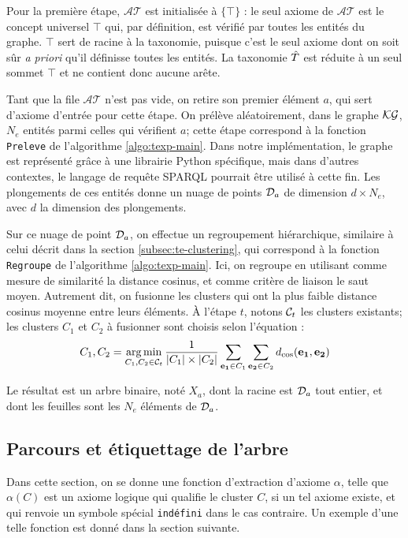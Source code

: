 Pour la première étape, $\mathcal{AT}$ est initialisée à $\{\top\}$ : le seul axiome de $\mathcal{AT}$ est le concept universel $\top$ qui, par définition, est vérifié par toutes les entités du graphe. $\top$ sert de racine à la taxonomie, puisque c'est le seul axiome dont on soit sûr \textit{a priori} qu'il définisse toutes les entités.
La taxonomie $\Tpred$ est réduite à un seul sommet $\top$ et ne contient donc aucune arête. 

Tant que la file $\mathcal{AT}$ n'est pas vide, on retire son premier élément $a$, qui sert d'axiome d'entrée pour cette étape. On prélève aléatoirement, dans le graphe $\KG$, $N_e$ entités parmi celles qui vérifient $a$; cette étape correspond à la fonction \texttt{Preleve} de l'algorithme \ref{algo:texp-main}. Dans notre implémentation, le graphe est représenté grâce à une librairie Python spécifique, mais dans d'autres contextes, le langage de requête SPARQL pourrait être utilisé à cette fin. Les plongements de ces entités donne un nuage de points $\cal{D}_a$ de dimension $d \times N_e$, avec $d$ la dimension des plongements.

Sur ce nuage de point $\cal{D}_a$, on effectue un regroupement hiérarchique, similaire à celui décrit dans la section \ref{subsec:te-clustering}, qui correspond à la fonction \texttt{Regroupe} de l'algorithme \ref{algo:texp-main}.
Ici, on regroupe en utilisant comme mesure de similarité la distance cosinus, et comme critère de liaison le saut moyen. Autrement dit, on fusionne les clusters qui ont la plus faible distance cosinus moyenne entre leurs éléments. À l'étape $t$, notons $\cal{C}_t$ les clusters existants; les clusters $C_1$ et $C_2$ à fusionner sont choisis selon l'équation :
\begin{equation}
    C_1, C_2 = \argmin_{C_1, C_2 \in \cal{C}_t} \frac{1}{|C_1| \times |C_2|} \sum_{\bf{e_1}\in C_1} \sum_{\bf{e_2} \in C_2} d_\text{cos}(\bf{e_1, e_2})
\end{equation}

Le résultat est un arbre binaire, noté $X_a$, dont la racine est $\cal{D}_a$ tout entier, et dont les feuilles sont les $N_e$ éléments de $\cal{D}_a$. 

\subsection{Parcours et étiquettage de l'arbre}
\label{subsec:texp-tree-labelling}
Dans cette section, on se donne une fonction d'extraction d'axiome $\alpha$, telle que $\alpha(C)$ est un axiome logique qui qualifie le cluster $C$, si un tel axiome existe, et qui renvoie un symbole spécial \texttt{indéfini} dans le cas contraire. Un exemple d'une telle fonction est donné dans la section suivante. 

